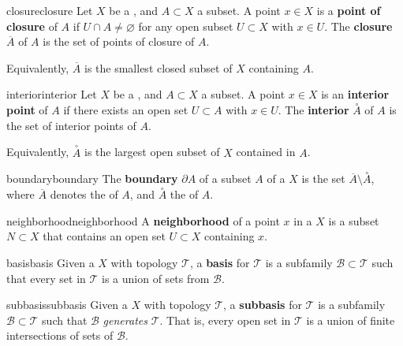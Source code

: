 \begin{topic}{closure}{closure}
    Let $X$ be a , and $A \subset X$ a subset. A point $x \in X$ is a \textbf{point of closure} of $A$ if $U \cap A \ne \varnothing$ for any open subset $U \subset X$ with $x \in U$. The \textbf{closure} $\overline{A}$ of $A$ is the set of points of closure of $A$.
    
    Equivalently, $\overline{A}$ is the smallest closed subset of $X$ containing $A$.
\end{topic}

\begin{topic}{interior}{interior}
    Let $X$ be a , and $A \subset X$ a subset. A point $x \in X$ is an \textbf{interior point} of $A$ if there exists an open set $U \subset A$ with $x \in U$. The \textbf{interior} $\overset{\circ}{A}$ of $A$ is the set of interior points of $A$.
    
    Equivalently, $\overset{\circ}{A}$ is the largest open subset of $X$ contained in $A$.
\end{topic}

\begin{topic}{boundary}{boundary}
    The \textbf{boundary} $\partial A$ of a subset $A$ of a  $X$ is the set $\overline{A} \setminus \overset{\circ}{A}$, where $\overline{A}$ denotes the  of $A$, and $\overset{\circ}{A}$ the  of $A$.
\end{topic}

\begin{topic}{neighborhood}{neighborhood}
    A \textbf{neighborhood} of a point $x$ in a  $X$ is a subset $N \subset X$ that contains an open set $U \subset X$ containing $x$.
\end{topic}

\begin{topic}{basis}{basis}
    Given a  $X$ with topology $\mathcal{T}$, a \textbf{basis} for $\mathcal{T}$ is a subfamily $\mathcal{B} \subset \mathcal{T}$ such that every set in $\mathcal{T}$ is a union of sets from $\mathcal{B}$.
\end{topic}

\begin{topic}{subbasis}{subbasis}
    Given a  $X$ with topology $\mathcal{T}$, a \textbf{subbasis} for $\mathcal{T}$ is a subfamily $\mathcal{B} \subset \mathcal{T}$ such that $\mathcal{B}$ \textit{generates} $\mathcal{T}$. That is, every open set in $\mathcal{T}$ is a union of finite intersections of sets of $\mathcal{B}$.
\end{topic}

